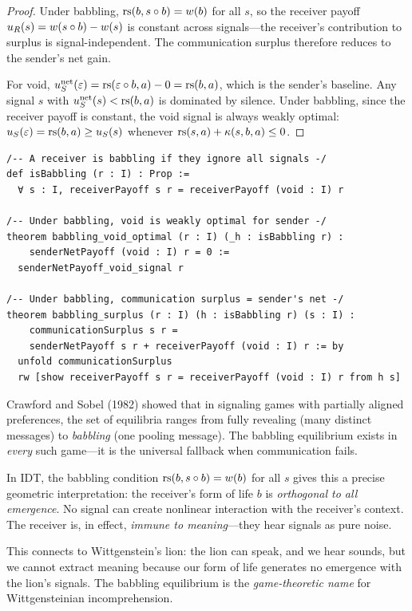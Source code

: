 \begin{proof}
Under babbling, $\mathrm{rs}(b, s \circ b) = w(b)$ for all $s$, so the receiver
payoff $u_R(s) = w(s \circ b) - w(s)$ is constant across signals---the
receiver's contribution to surplus is signal-independent. The communication
surplus therefore reduces to the sender's net gain.

For void, $u_S^{\text{net}}(\varepsilon) = \mathrm{rs}(\varepsilon \circ b, a) - 0 = \mathrm{rs}(b, a)$,
which is the sender's baseline. Any signal $s$ with
$u_S^{\text{net}}(s) < \mathrm{rs}(b, a)$ is dominated by silence. Under babbling, since
the receiver payoff is constant, the void signal is always weakly optimal:
$u_S(\varepsilon) = \mathrm{rs}(b, a) \geq u_S(s)$ whenever $\mathrm{rs}(s, a) + \kappa(s, b, a) \leq 0$.
\end{proof}

\begin{lstlisting}[caption={Lean 4: Babbling equilibrium}]
/-- A receiver is babbling if they ignore all signals -/
def isBabbling (r : I) : Prop :=
  ∀ s : I, receiverPayoff s r = receiverPayoff (void : I) r

/-- Under babbling, void is weakly optimal for sender -/
theorem babbling_void_optimal (r : I) (_h : isBabbling r) :
    senderNetPayoff (void : I) r = 0 :=
  senderNetPayoff_void_signal r

/-- Under babbling, communication surplus = sender's net -/
theorem babbling_surplus (r : I) (h : isBabbling r) (s : I) :
    communicationSurplus s r =
    senderNetPayoff s r + receiverPayoff (void : I) r := by
  unfold communicationSurplus
  rw [show receiverPayoff s r = receiverPayoff (void : I) r from h s]
\end{lstlisting}

\begin{interpretation}
Crawford and Sobel (1982) showed that in signaling games with
partially aligned preferences, the set of equilibria ranges from
fully revealing (many distinct messages) to \emph{babbling} (one
pooling message). The babbling equilibrium exists in \emph{every}
such game---it is the universal fallback when communication fails.

In IDT, the babbling condition $\mathrm{rs}(b, s \circ b) = w(b)$ for all $s$
gives this a precise geometric interpretation: the receiver's form of life
$b$ is \emph{orthogonal to all emergence}. No signal can create nonlinear
interaction with the receiver's context. The receiver is, in effect,
\emph{immune to meaning}---they hear signals as pure noise.

This connects to Wittgenstein's lion: the lion can speak, and we hear
sounds, but we cannot extract meaning because our form of life generates
no emergence with the lion's signals. The babbling equilibrium is the
\emph{game-theoretic name} for Wittgensteinian incomprehension.
\end{interpretation}

